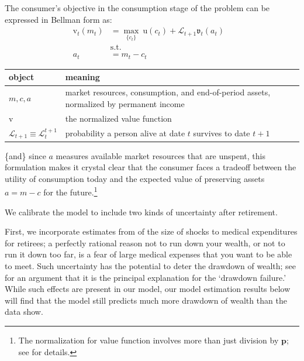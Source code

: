 \documentclass{article}
\newcommand{\uFunc}{\mathrm{u}}
\newcommand{\pLvl}{\mathbf{p}}
\newcommand{\vFunc}{\mathrm{v}}
\newcommand{\Alive}{\mathcal{L}}
\newcommand{\tranShkEmp}{\xi}
\newcommand{\cNrm}{c}
\newcommand{\RNrm}{\mathcal{R}}
\newcommand{\aNrm}{a}
\newcommand{\mNrm}{m}
\begin{document}
The consumer's objective in the consumption stage of the problem can be expressed in Bellman form as:
\begin{align}
    {\vFunc}_{t}({\mNrm}_{t}) & = \max_{\{\cNrm_{t}\}} ~ \uFunc(\cNrm_{t})+\Alive_{t+1} \mathfrak{v}_{t}(\aNrm_{t})
    \\ & \text{s.t.} &
    \\ \aNrm_{t} & = {\mNrm}_{t}-\cNrm_{t}
\end{align}

\newline
\bigskip\noindent
\begin{tabular}{p{}p{}}
\toprule
object & meaning \\
\hline
$\mNrm, \cNrm, \aNrm$ & market resources, consumption, and end-of-period assets, normalized by permanent income \\
$\vFunc$ & the normalized value function \\
$\Alive_{t+1} \equiv \Alive_{t}^{t+1}$ & probability a person alive at date $t$ survives to date $t+1$ \\
\bottomrule
\end{tabular}

\bigskip\newline
\{and\} since $\aNrm$ measures available market resources that are unspent, this formulation makes it crystal clear that the consumer faces a tradeoff between the utility of consumption today and the expected value of preserving assets $\aNrm=\mNrm -\cNrm$ for the future.\footnote{The normalization for value function involves more than just division by $\pLvl$; see \cite{BufferStockTheory} for details.}

We calibrate the model to include two kinds of uncertainty after retirement.

First, we incorporate estimates from \cite{velasquezgiraldoJMP} of the size of shocks to medical expenditures for retirees; a perfectly rational reason not to run down your wealth, or not to run it down too far, is a fear of large medical expenses that you want to be able to meet.  Such uncertainty has the potential to deter the drawdown of wealth; see \cite{ameriks2011joy} for an argument that it is the principal explanation for the `drawdown failure.'  While such effects are present in our model, our model estimation results below will find that the model still predicts much more drawdown of wealth than the data show.
\end{document}
